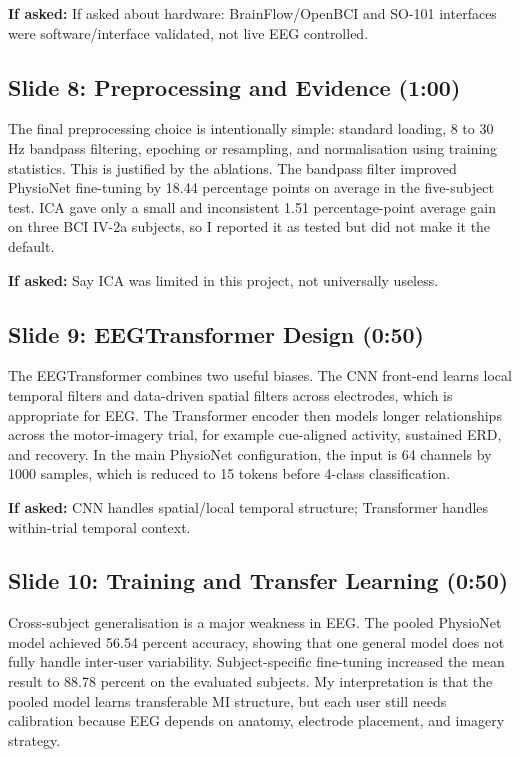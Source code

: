 \documentclass[11pt]{article}
\begin{document}
\textbf{If asked:} If asked about hardware: BrainFlow/OpenBCI and SO-101 interfaces were software/interface validated, not live EEG controlled.

\subsection*{Slide 8: Preprocessing and Evidence (1:00)}
The final preprocessing choice is intentionally simple: standard loading, 8 to 30 Hz bandpass filtering, epoching or resampling, and normalisation using training statistics. This is justified by the ablations. The bandpass filter improved PhysioNet fine-tuning by 18.44 percentage points on average in the five-subject test. ICA gave only a small and inconsistent 1.51 percentage-point average gain on three BCI IV-2a subjects, so I reported it as tested but did not make it the default.


\textbf{If asked:} Say ICA was limited in this project, not universally useless.

\subsection*{Slide 9: EEGTransformer Design (0:50)}
The EEGTransformer combines two useful biases. The CNN front-end learns local temporal filters and data-driven spatial filters across electrodes, which is appropriate for EEG. The Transformer encoder then models longer relationships across the motor-imagery trial, for example cue-aligned activity, sustained ERD, and recovery. In the main PhysioNet configuration, the input is 64 channels by 1000 samples, which is reduced to 15 tokens before 4-class classification.


\textbf{If asked:} CNN handles spatial/local temporal structure; Transformer handles within-trial temporal context.

\subsection*{Slide 10: Training and Transfer Learning (0:50)}
Cross-subject generalisation is a major weakness in EEG. The pooled PhysioNet model achieved 56.54 percent accuracy, showing that one general model does not fully handle inter-user variability. Subject-specific fine-tuning increased the mean result to 88.78 percent on the evaluated subjects. My interpretation is that the pooled model learns transferable MI structure, but each user still needs calibration because EEG depends on anatomy, electrode placement, and imagery strategy.
\end{document}
